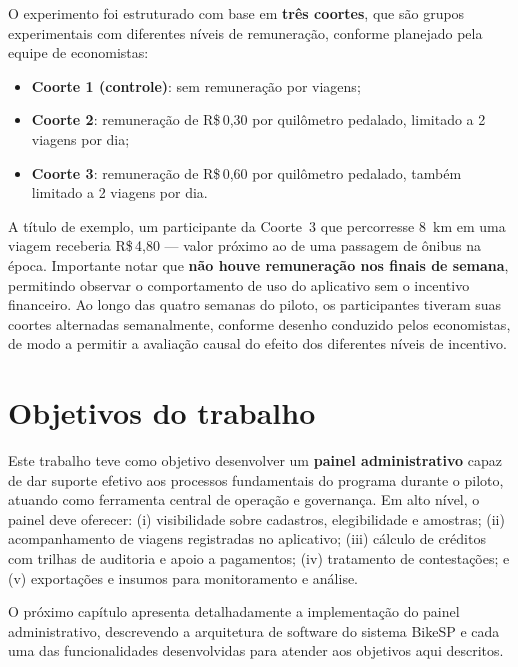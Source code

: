 O experimento foi estruturado com base em \textbf{três coortes}, que são grupos experimentais com diferentes níveis de
remuneração, conforme planejado pela equipe de economistas:
\begin{itemize}
  \item \textbf{Coorte 1 (controle)}: sem remuneração por viagens;
  \item \textbf{Coorte 2}: remuneração de R\$\,0,30 por quilômetro pedalado,
        limitado a 2 viagens por dia;
  \item \textbf{Coorte 3}: remuneração de R\$\,0,60 por quilômetro pedalado,
        também limitado a 2 viagens por dia.
\end{itemize}
A título de exemplo, um participante da Coorte~3 que percorresse 8~km em uma
viagem receberia R\$\,4,80 --- valor próximo ao de uma passagem de ônibus na
época. Importante notar que \textbf{não houve remuneração nos finais de semana},
permitindo observar o comportamento de uso do aplicativo sem o incentivo
financeiro. Ao longo das quatro semanas do piloto, os participantes tiveram suas
coortes alternadas semanalmente, conforme desenho conduzido pelos economistas,
de modo a permitir a avaliação causal do efeito dos diferentes níveis de
incentivo.


\section{Objetivos do trabalho}
\label{sec:objetivos-trabalho}
Este trabalho teve como objetivo desenvolver um \textbf{painel administrativo} capaz
de dar suporte efetivo aos processos fundamentais do programa durante o piloto,
atuando como ferramenta central de operação e governança. Em alto nível, o
painel deve oferecer: (i) visibilidade sobre cadastros, elegibilidade e
amostras; (ii) acompanhamento de viagens registradas no aplicativo; (iii)
cálculo de créditos com trilhas de auditoria e apoio a pagamentos; (iv)
tratamento de contestações; e (v) exportações e insumos para monitoramento e
análise.

O próximo capítulo apresenta detalhadamente a implementação do painel administrativo, descrevendo a arquitetura de software do sistema BikeSP e cada uma das funcionalidades desenvolvidas para atender aos objetivos aqui descritos.


